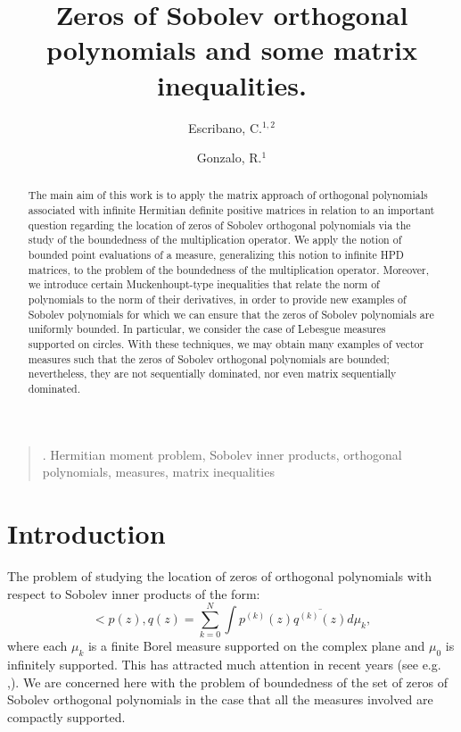 \documentclass[12pt]{amsart}
\title{Zeros of Sobolev orthogonal polynomials and some matrix inequalities. 
 }
\author[1,2]{ Escribano, C.$^{1,2}$}
\author[1]{ Gonzalo, R.$^{1}$}
\theoremstyle{definition}
\theoremstyle{plain}
\theoremstyle{remark}
\begin{document}
\begin{abstract} The main aim of this work is to apply the  matrix approach of orthogonal polynomials associated with infinite Hermitian definite positive matrices in relation to an important question regarding the  location of zeros of Sobolev orthogonal polynomials via the study of the boundedness of the multiplication operator. 
We apply the notion of bounded point evaluations of a measure, generalizing this notion  to infinite HPD matrices, to the problem of the boundedness of the multiplication operator. Moreover, we introduce certain Muckenhoupt-type inequalities that relate the norm of polynomials to the norm of their derivatives, in order to provide new examples of Sobolev polynomials for which we can ensure that the zeros of Sobolev polynomials are uniformly bounded. In particular, we consider the case of Lebesgue measures supported on circles. With these techniques, we may obtain many examples of vector measures such that the zeros of Sobolev orthogonal polynomials are bounded; nevertheless, they are not sequentially dominated, nor even matrix sequentially dominated. 
\end{abstract}

\maketitle
\begin{quotation} {}. {\small Hermitian moment problem,  Sobolev inner products, orthogonal polynomials,
 measures, matrix inequalities}
\end{quotation}

\section{Introduction}


\noindent The problem of studying the location of zeros of orthogonal polynomials  with respect to Sobolev inner products of the form: 
\begin{equation}\label{sobolev-inner}
<p(z),q(z)=\sum_{k=0}^{N} \int p^{(k)}(z)\overline{q^{(k)}(z)}d\mu_k,
\end{equation}
\noindent where each $\mu_k$ is a finite Borel measure supported on the complex plane and $\mu_0$ is infinitely supported. This has attracted much attention in recent years (see e.g. \cite{LP},\cite{LPP}). We are concerned here with the problem of boundedness of the set of zeros of Sobolev orthogonal polynomials in the case that all the measures involved are compactly supported. 
\end{document}
